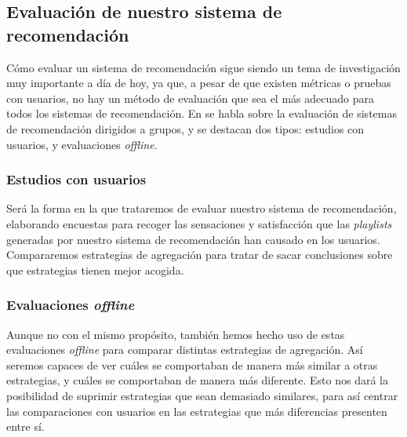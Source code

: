 \subsection{Evaluación de nuestro sistema de recomendación\label{SEC:EVALUACION}}

Cómo evaluar un sistema de recomendación sigue siendo un tema de investigación muy importante a día de hoy, ya que, a pesar de que existen métricas o 
pruebas con usuarios, no hay un método de evaluación que sea el más adecuado para todos los sistemas de recomendación. En \cite{grouprecommender} se habla
sobre la evaluación de sistemas de recomendación dirigidos a grupos, y se destacan dos tipos: estudios con usuarios, y evaluaciones \textit{offline}.

\subsubsection{Estudios con usuarios}

Será la forma en la que trataremos de evaluar nuestro sistema de recomendación, elaborando encuestas para recoger las sensaciones y satisfacción
que las \textit{playlists} generadas por nuestro sistema de recomendación han causado en los usuarios. Compararemos estrategias de agregación para tratar de sacar conclusiones
sobre que estrategias tienen mejor acogida.

\subsubsection{Evaluaciones \textit{offline}}

Aunque no con el mismo propósito, también hemos hecho uso de estas evaluaciones \textit{offline} para comparar distintas estrategias de agregación. Así seremos
capaces de ver cuáles se comportaban de manera más similar a otras estrategias, y cuáles se comportaban de manera más diferente. Esto nos dará la posibilidad de suprimir
estrategias que sean demasiado similares, para así centrar las comparaciones con usuarios en las estrategias que más diferencias presenten entre sí.

